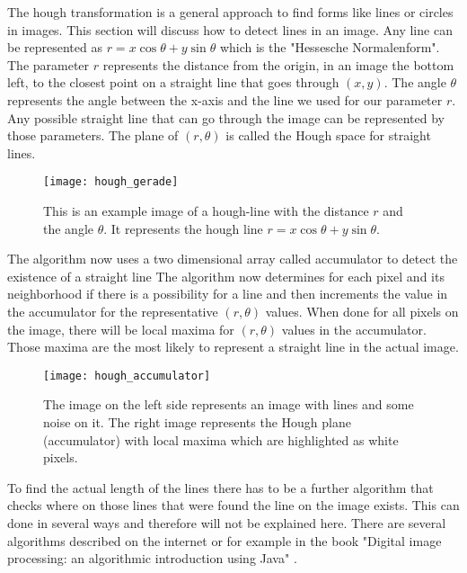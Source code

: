 The hough transformation is a general approach to find forms like lines or circles in images. This section will discuss how to detect lines in an image.
Any line can be represented as $r = x \cos \theta + y \sin \theta$ which is the "Hessesche Normalenform". The parameter $r$ represents the distance from the origin, in an image the bottom left, to the closest point on a straight line that goes through $(x,y)$. The angle $\theta$ represents the angle between the x-axis and the line we used for our parameter $r$. Any possible straight line that can go through the image can be represented by those parameters. The plane of $(r,\theta)$ is called the Hough space for straight lines.

\begin{figure}[h]
	\centering
	\texttt{[image: hough\_gerade]}
	\caption{This is an example image of a hough-line with the distance $r$ and the angle $\theta$. It represents the hough line $r = x \cos \theta + y \sin \theta$.}
	\label{fig:hough_line}
\end{figure}

The algorithm now uses a two dimensional array called accumulator to detect the existence of a straight line The algorithm now determines for each pixel and its neighborhood if there is a possibility for a line and then increments the value in the accumulator for the representative $(r,\theta)$ values. When done for all pixels on the image, there will be local maxima for $(r,\theta)$ values in the accumulator. Those maxima are the most likely to represent a straight line in the actual image.  

\begin{figure}[h]
	\centering
	\texttt{[image: hough\_accumulator]}
	\caption{The image on the left side represents an image with lines and some noise on it. The right image represents the Hough plane (accumulator) with local maxima which are highlighted as white pixels.}
	\label{fig:hough_accumulator}
\end{figure}

To find the actual length of the lines there has to be a further algorithm that checks where on those lines that were found the line on the image exists. This can done in several ways and therefore will not be explained here. There are several algorithms described on the internet or for example in the book "Digital image processing: an algorithmic introduction using Java" \cite{burger_burge_2016}.

\pagebreak

